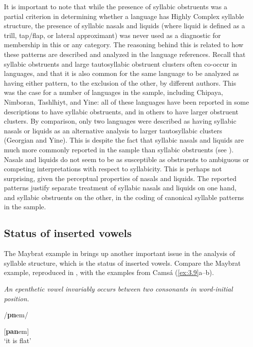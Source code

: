   It is important to note that while the presence of syllabic obstruents was a partial criterion in determining whether a language has Highly Complex syllable structure, the presence of syllabic nasals and liquids (where liquid is defined as a trill, tap/flap, or lateral approximant) was never used as a diagnostic for membership in this or any category. The reasoning behind this is related to how these patterns are described and analyzed in the language references. Recall that syllabic obstruents and large tautosyllabic obstruent clusters often co-occur in languages, and that it is also common for the same language to be analyzed as having either pattern, to the exclusion of the other, by different authors. This was the case for a number of languages in the sample, including Chipaya, Nimboran, Tashlhiyt, and Yine: all of these languages have been reported in some descriptions to have syllabic obstruents, and in others to have larger obstruent clusters. By comparison, only two languages were described as having syllabic nasals or liquids as an alternative analysis to larger tautosyllabic clusters (Georgian and Yine). This is despite the fact that syllabic nasals and liquids are much more commonly reported in the sample than syllabic obstruents (see ). Nasals and liquids do not seem to be as susceptible as obstruents to ambiguous or competing interpretations with respect to syllabicity. This is perhaps not surprising, given the perceptual properties of nasals and liquids. The reported patterns justify separate treatment of syllabic nasals and liquids on one hand, and syllabic obstruents on the other, in the coding of canonical syllable patterns in the sample.

\subsection{Status of inserted vowels}\label{sec:3.2.2}

  The Maybrat example in  brings up another important issue in the analysis of syllable structure, which is the status of inserted vowels. Compare the Maybrat example, reproduced in , with the examples from Camsá (\ref{ex:3.9}a--b).

\ea\label{ex:3.8}

\textit{An epenthetic vowel invariably occurs between two consonants in word-initial position.}

/\textbf{pn}em/

[\textbf{pan}em]\\
\glt ‘it is flat’
\citep[35-6]{Dol2007}
\z

